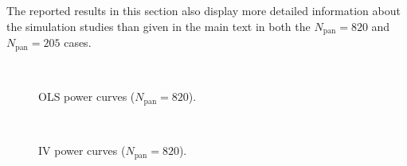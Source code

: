 \documentclass[preprint]{imsart}
\numberwithin{equation}{section}
\theoremstyle{plain}
\theoremstyle{definition}
\renewcommand{\(}{\left(}
\renewcommand{\)}{\right)}
\renewcommand{\[}{\left[}
\renewcommand{\]}{\right]}
\begin{document}
{The reported results in this section also display more detailed information about the simulation studies than given in the main text in both the $N_{\mathrm{pan}}=820$ and $N_{\mathrm{pan}}=205$ cases.

















\begin{figure}[t]
	\centering
	\qquad
	\\
	\caption{OLS power curves ($N_{\text{pan}}=820$).}
\end{figure}


\begin{figure}[t]
	\centering
	\qquad
	\\
	\caption{IV power curves ($N_{\text{pan}}=820$).}
\end{figure}



\begin{landscape}
	
\end{landscape}

\begin{landscape}
	
\end{landscape}

\begin{landscape}
	
\end{landscape}

}
\end{document}
